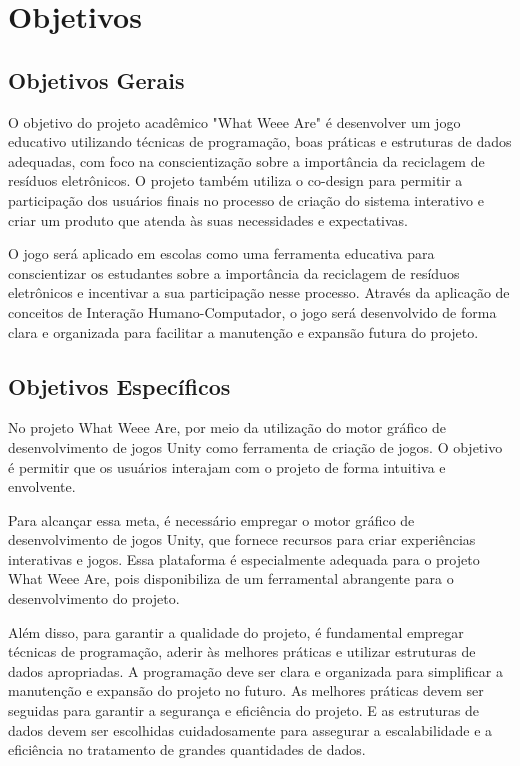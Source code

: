 \section{Objetivos}
\label{Objetivos}

\subsection{Objetivos Gerais}
O objetivo do projeto acadêmico "What Weee Are" é desenvolver um jogo educativo utilizando técnicas de programação, boas práticas e estruturas de dados adequadas, com foco na conscientização sobre a importância da reciclagem de resíduos eletrônicos. O projeto também utiliza o co-design para permitir a participação dos usuários finais no processo de criação do sistema interativo e criar um produto que atenda às suas necessidades e expectativas.

O jogo será aplicado em escolas como uma ferramenta educativa para conscientizar os estudantes sobre a importância da reciclagem de resíduos eletrônicos e incentivar a sua participação nesse processo. Através da aplicação de conceitos de Interação Humano-Computador, o jogo será desenvolvido de forma clara e organizada para facilitar a manutenção e expansão futura do projeto.

\subsection{Objetivos Específicos}
No projeto What Weee Are, por meio da utilização do motor gráfico de desenvolvimento de jogos Unity como ferramenta de criação de jogos. O objetivo é permitir que os usuários interajam com o projeto de forma intuitiva e envolvente.

Para alcançar essa meta, é necessário empregar o motor gráfico de desenvolvimento de jogos Unity, que fornece recursos para criar experiências interativas e jogos. Essa plataforma é especialmente adequada para o projeto What Weee Are, pois disponibiliza de um ferramental abrangente para o desenvolvimento do projeto.

Além disso, para garantir a qualidade do projeto, é fundamental empregar técnicas de programação, aderir às melhores práticas e utilizar estruturas de dados apropriadas. A programação deve ser clara e organizada para simplificar a manutenção e expansão do projeto no futuro. As melhores práticas devem ser seguidas para garantir a segurança e eficiência do projeto. E as estruturas de dados devem ser escolhidas cuidadosamente para assegurar a escalabilidade e a eficiência no tratamento de grandes quantidades de dados.

